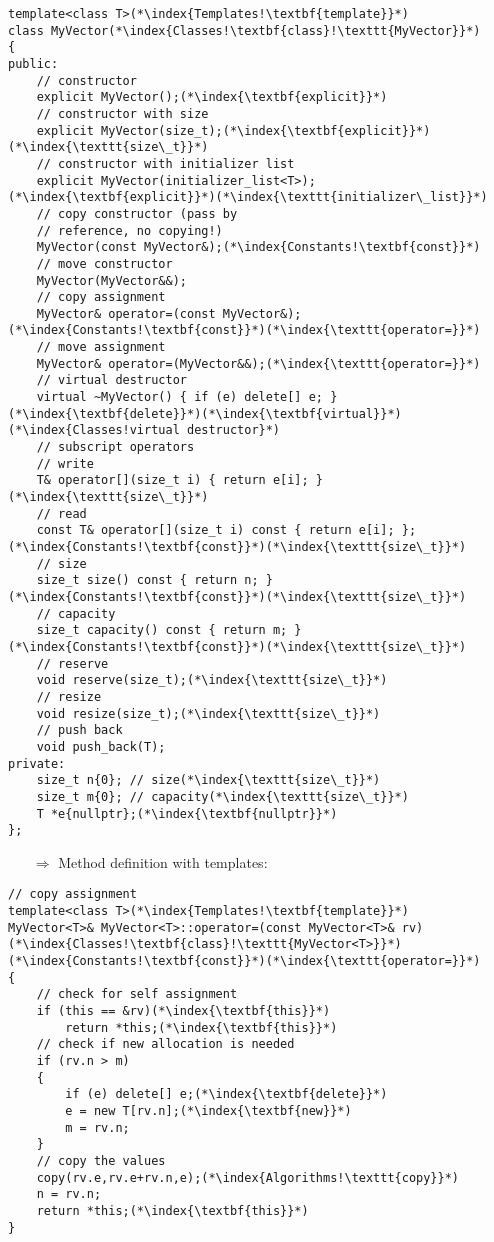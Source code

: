 \documentclass[10pt]{article}
\begin{document}
\begin{lstlisting}
template<class T>(*\index{Templates!\textbf{template}}*)
class MyVector(*\index{Classes!\textbf{class}!\texttt{MyVector}}*)
{
public:
    // constructor
    explicit MyVector();(*\index{\textbf{explicit}}*)
    // constructor with size
    explicit MyVector(size_t);(*\index{\textbf{explicit}}*)(*\index{\texttt{size\_t}}*)
    // constructor with initializer list
    explicit MyVector(initializer_list<T>);(*\index{\textbf{explicit}}*)(*\index{\texttt{initializer\_list}}*)
    // copy constructor (pass by
    // reference, no copying!)
    MyVector(const MyVector&);(*\index{Constants!\textbf{const}}*)
    // move constructor
    MyVector(MyVector&&);
    // copy assignment
    MyVector& operator=(const MyVector&);(*\index{Constants!\textbf{const}}*)(*\index{\texttt{operator=}}*)
    // move assignment
    MyVector& operator=(MyVector&&);(*\index{\texttt{operator=}}*)
    // virtual destructor
    virtual ~MyVector() { if (e) delete[] e; }(*\index{\textbf{delete}}*)(*\index{\textbf{virtual}}*)(*\index{Classes!virtual destructor}*)
    // subscript operators
    // write
    T& operator[](size_t i) { return e[i]; }(*\index{\texttt{size\_t}}*)
    // read
    const T& operator[](size_t i) const { return e[i]; };(*\index{Constants!\textbf{const}}*)(*\index{\texttt{size\_t}}*)
    // size
    size_t size() const { return n; }(*\index{Constants!\textbf{const}}*)(*\index{\texttt{size\_t}}*)
    // capacity
    size_t capacity() const { return m; }(*\index{Constants!\textbf{const}}*)(*\index{\texttt{size\_t}}*)
    // reserve
    void reserve(size_t);(*\index{\texttt{size\_t}}*)
    // resize
    void resize(size_t);(*\index{\texttt{size\_t}}*)
    // push back
    void push_back(T);
private:
    size_t n{0}; // size(*\index{\texttt{size\_t}}*)
    size_t m{0}; // capacity(*\index{\texttt{size\_t}}*)
    T *e{nullptr};(*\index{\textbf{nullptr}}*)
};
\end{lstlisting}
\begin{enumerate}
\item[$\Rightarrow$] Method definition with templates:
\end{enumerate}
\begin{lstlisting}
// copy assignment
template<class T>(*\index{Templates!\textbf{template}}*)
MyVector<T>& MyVector<T>::operator=(const MyVector<T>& rv)(*\index{Classes!\textbf{class}!\texttt{MyVector<T>}}*)(*\index{Constants!\textbf{const}}*)(*\index{\texttt{operator=}}*)
{
    // check for self assignment
    if (this == &rv)(*\index{\textbf{this}}*)
        return *this;(*\index{\textbf{this}}*)
    // check if new allocation is needed
    if (rv.n > m)
    {
        if (e) delete[] e;(*\index{\textbf{delete}}*)
        e = new T[rv.n];(*\index{\textbf{new}}*)
        m = rv.n;
    }
    // copy the values
    copy(rv.e,rv.e+rv.n,e);(*\index{Algorithms!\texttt{copy}}*)
    n = rv.n;
    return *this;(*\index{\textbf{this}}*)
}
\end{lstlisting}
\end{document}
